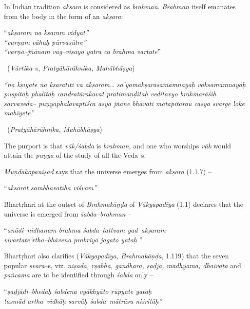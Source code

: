 In Indian tradition \textit{akṣara} is considered as \textit{brahman}. \textit{Brahman} itself emanates from the body in the form of an \textit{akṣara}:

\begin{myquote}
“\textit{akṣaram na kṣaram vidyāt”}\\\textit{“varṇam vāhuḥ pūrvasūtre”}\\\textit{“varṇa–jñānam vāg–viṣayo yatra ca brahma vartate}” 

~\hfill (\textit{Vārtika}–s, \textit{Pratyāhārāhnika, Mahābhāṣya})
\end{myquote}

\begin{myquote}
\textit{“na kṣīyate na kṣaratīti vā akṣaram… so’yamakṣarasamāmnāyaḥ vāksamāmnāyaḥ puṣpitaḥ phalitaḥ candratārakavat pratimaṇḍitaḥ veditavyo brahmarāśiḥ sarvaveda– puṇyaphalāvāptiśca asya jñāne bhavati mātāpitarau cāsya svarge loke mahīyete”} 

~\hfill (\textit{Pratyāhārāhnika, Mahābhāṣya})
\end{myquote}

The purport is that \textit{vāk/śabda} is \textit{brahman,} and one who worships \textit{vāk} would attain the \textit{puṇya} of the study of all the Veda–s.

\textit{Muṇḍakopaniṣad} says that the universe emerges from \textit{akṣara} (1.1.7) –

\begin{myquote}
“\textit{akṣarāt sambhavatīha viśvam”}
\end{myquote}

Bhartṛhari at the outset of \textit{Brahmakāṇḍa} of \textit{Vākyapadīya} (1.1) declares that the universe is emerged from \textit{śabda–brahman} –

\begin{myquote}
“\textit{anādi–nidhanam brahma śabda–tattvam yad–akṣaram }\\\textit{vivartate’rtha–bhāvena prakriyā jagato yataḥ} ”
\end{myquote}

Bhartṛhari also clarifies (\textit{Vākyapadīya, Brahmakāṇḍa}, 1.119) that the seven popular \textit{svara}–s, viz. \textit{niṣāda, ṛṣabha, gāndhāra, ṣaḍja, madhyama, dhaivata} and \textit{pañcama} are to be identified through \textit{śabda} only –

\begin{myquote}
“\textit{ṣaḍjādi–bhedaḥ śabdena vyākhyāto rūpyate yataḥ }\\\textit{tasmād artha–vidhāḥ sarvāḥ śabda–mātrāsu niśritāḥ”} 
\end{myquote}

